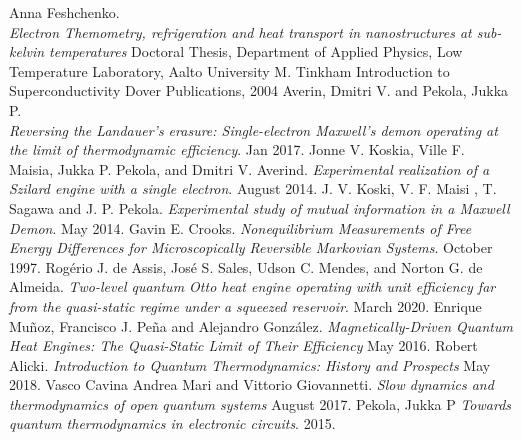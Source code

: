 \documentclass[12pt]{article}
\begin{document}
\begin{thebibliography}{9}
    Anna Feshchenko. \\
    \textit{Electron Themometry, refrigeration and heat transport in nanostructures at sub-kelvin temperatures}
    Doctoral Thesis, Department of Applied Physics, Low Temperature Laboratory, Aalto University
    M. Tinkham 
    Introduction to Superconductivity
    Dover Publications, 2004
    Averin, Dmitri V. and Pekola, Jukka P. \\
    \textit{Reversing the Landauer’s erasure: Single-electron Maxwell’s demon operating at the limit of thermodynamic efficiency}.
    Jan 2017. 
    Jonne V. Koskia, Ville F. Maisia, Jukka P. Pekola, and Dmitri V. Averind.
    \textit{Experimental realization of a Szilard engine with
    a single electron}.
    August 2014. 
    J. V. Koski, V. F. Maisi , T. Sagawa and J. P. Pekola. 
    \textit{Experimental study of mutual information in a Maxwell Demon}. 
    May 2014. 
    Gavin E. Crooks.
    \textit{Nonequilibrium Measurements of Free Energy
    Differences for Microscopically Reversible
    Markovian Systems}.
    October 1997. 
    Rogério J. de Assis, José S. Sales, Udson C. Mendes, and Norton G. de Almeida.
    \textit{Two-level quantum Otto heat engine operating with unit efficiency far from the quasi-static
    regime under a squeezed reservoir}.
    March 2020.
    Enrique Muñoz, Francisco J. Peña and Alejandro González.
    \textit{Magnetically-Driven Quantum Heat Engines:
    The Quasi-Static Limit of Their Efficiency}
    May 2016. 
    Robert Alicki.
    \textit{Introduction to Quantum Thermodynamics:
    History and Prospects}
    May 2018.
    Vasco Cavina Andrea Mari and Vittorio Giovannetti.
    \textit{Slow dynamics and thermodynamics of open quantum systems}
    August 2017. 
    Pekola, Jukka P
    \textit{Towards quantum thermodynamics in electronic circuits}.
    2015.

\end{thebibliography}
\end{document}
